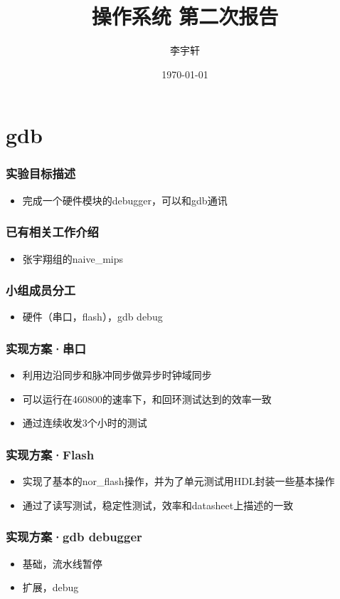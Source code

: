 ﻿\documentclass[11pt]{beamer}
\title{操作系统 \quad 第二次报告}
\author{李宇轩}
\date{\today}
\date{}
\begin{document}
\maketitle

\section{gdb}

\begin{frame}
\frametitle{实验目标描述}
\begin{itemize}
\item 完成一个硬件模块的debugger，可以和gdb通讯
\end{itemize}
\end{frame}

\begin{frame}
\frametitle{已有相关工作介绍}
\begin{itemize}
\item 张宇翔组的naive\_mips
\end{itemize}
\end{frame}

\begin{frame}
\frametitle{小组成员分工}
\begin{itemize}
\item 硬件（串口，flash），gdb debug
\end{itemize}
\end{frame}

\begin{frame}
\frametitle{实现方案·串口}
\begin{itemize}
\item 利用边沿同步和脉冲同步做异步时钟域同步
\item 可以运行在460800的速率下，和回环测试达到的效率一致
\item 通过连续收发3个小时的测试
\end{itemize}
\end{frame}

\begin{frame}
\frametitle{实现方案·Flash}
\begin{itemize}
\item 实现了基本的nor\_flash操作，并为了单元测试用HDL封装一些基本操作
\item 通过了读写测试，稳定性测试，效率和datasheet上描述的一致
\end{itemize}
\end{frame}

\begin{frame}
\frametitle{实现方案·gdb debugger}
\begin{itemize}
\item 基础，流水线暂停
\item 扩展，debug
\end{itemize}
\end{frame}
\end{document}
